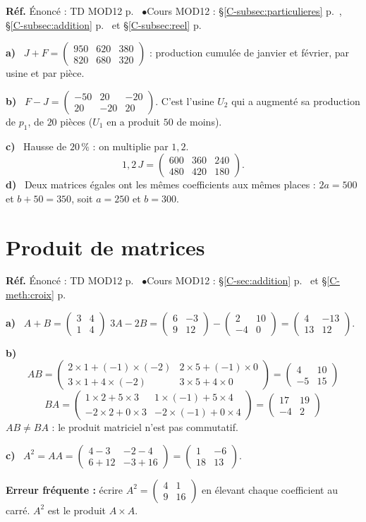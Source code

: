 \documentclass[a4paper,11pt]{article}
\newcommand{\M}[1]{\begin{pmatrix}#1\end{pmatrix}}
\newcommand{\cours}[1]{§\ref{C-#1} p.~\pageref{C-#1}}
\newcommand{\source}[2]{{\footnotesize\color{uimmgray}\textbf{Réf.} \enspace Énoncé : TD MOD12 p.~\pageref{T-#1} \enspace$\bullet$\enspace Cours MOD12 : #2}\par\smallskip}
\newcommand{\q}[1]{\textbf{\color{uimmblue}#1}\ }
\begin{document}
\begin{correction}
\source{exo:2}{\cours{subsec:particulieres}, \cours{subsec:addition} et \cours{subsec:reel}}
\q{a)} $J+F = \M{950 & 620 & 380\\ 820 & 680 & 320}$ : production cumulée de janvier et février, par usine et par pièce.

\q{b)} $F-J = \M{-50 & 20 & -20\\ 20 & -20 & 20}$. C'est l'usine $U_2$ qui a augmenté sa production de $p_1$, de $20$ pièces ($U_1$ en a produit $50$ de moins).

\q{c)} Hausse de $20\,\%$ : on multiplie par $1{,}2$.
\[
1{,}2\,J = \M{600 & 360 & 240\\ 480 & 420 & 180}.
\]
\q{d)} Deux matrices égales ont les mêmes coefficients aux mêmes places : $2a = 500$ et $b + 50 = 350$, soit $a = 250$ et $b = 300$.
\end{correction}

\needspace{8cm}
\section{Produit de matrices}

\begin{correction}
\source{exo:3}{\cours{sec:addition} et \cours{meth:croix}}
\q{a)} $A + B = \M{3 & 4\\ 1 & 4}$ \qquad $3A - 2B = \M{6 & -3\\ 9 & 12} - \M{2 & 10\\ -4 & 0} = \M{4 & -13\\ 13 & 12}$.

\q{b)}
\[
AB = \M{2\times 1 + (-1)\times(-2) & 2\times 5 + (-1)\times 0\\ 3\times 1 + 4\times(-2) & 3\times 5 + 4\times 0} = \M{4 & 10\\ -5 & 15}
\]
\[
BA = \M{1\times 2 + 5\times 3 & 1\times(-1) + 5\times 4\\ -2\times 2 + 0\times 3 & -2\times(-1) + 0\times 4} = \M{17 & 19\\ -4 & 2}
\]
$AB\neq BA$ : le produit matriciel n'est pas commutatif.

\q{c)} $A^2 = AA = \M{4-3 & -2-4\\ 6+12 & -3+16} = \M{1 & -6\\ 18 & 13}$.
\begin{piege}
\textbf{Erreur fréquente :} écrire $A^2 = \M{4 & 1\\ 9 & 16}$ en élevant chaque coefficient au carré. $A^2$ est le produit $A\times A$.
\end{piege}
\end{correction}
\end{document}
